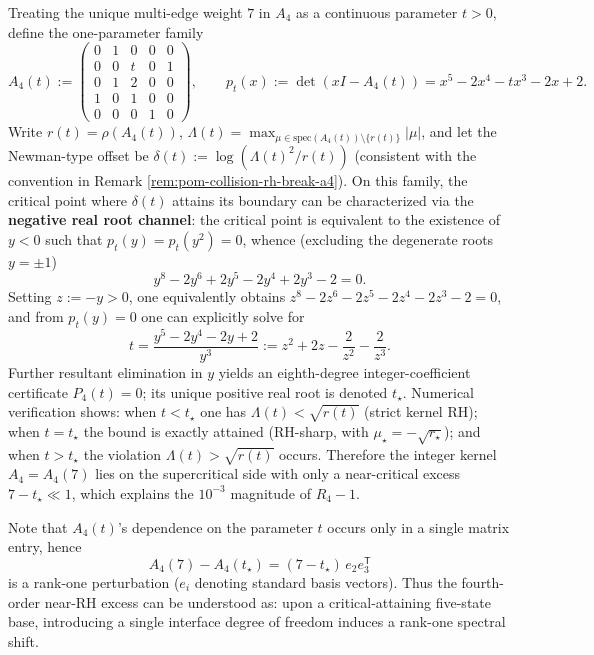 \begin{remark}\label{rem:pom-collision-rh-break-a4-threshold}
Treating the unique multi-edge weight \(7\) in \(A_4\) as a continuous parameter \(t>0\), define the one-parameter family
\[
A_4(t):=
\begin{pmatrix}
0&1&0&0&0\\
0&0&t&0&1\\
0&1&2&0&0\\
1&0&1&0&0\\
0&0&0&1&0
\end{pmatrix},
\qquad
p_t(x):=\det(xI-A_4(t))=x^5-2x^4-tx^3-2x+2.
\]
Write \(r(t)=\rho(A_4(t))\), \(\Lambda(t)=\max_{\mu\in\mathrm{spec}(A_4(t))\setminus\{r(t)\}}|\mu|\), and let the Newman-type offset be
\(
\delta(t):=\log(\Lambda(t)^2/r(t))
\)
(consistent with the convention in Remark \ref{rem:pom-collision-rh-break-a4}).
On this family, the critical point where \(\delta(t)\) attains its boundary can be characterized via the \textbf{negative real root channel}: the critical point is equivalent to the existence of \(y<0\) such that \(p_t(y)=p_t(y^2)=0\), whence (excluding the degenerate roots \(y=\pm 1\))
\[
y^8-2y^6+2y^5-2y^4+2y^3-2=0.
\]
Setting \(z:=-y>0\), one equivalently obtains
\(
z^8-2z^6-2z^5-2z^4-2z^3-2=0
\), and from \(p_t(y)=0\) one can explicitly solve for
\[
t=\frac{y^5-2y^4-2y+2}{y^3}
:=z^2+2z-\frac{2}{z^2}-\frac{2}{z^3}.
\]
Further resultant elimination in \(y\) yields an eighth-degree integer-coefficient certificate \(P_4(t)=0\); its unique positive real root is denoted \(t_\star\).
Numerical verification shows: when \(t<t_\star\) one has \(\Lambda(t)<\sqrt{r(t)}\) (strict kernel RH); when \(t=t_\star\) the bound is exactly attained (RH-sharp, with \(\mu_\star=-\sqrt{r_\star}\)); and when \(t>t_\star\) the violation \(\Lambda(t)>\sqrt{r(t)}\) occurs.
 Therefore the integer kernel \(A_4=A_4(7)\) lies on the supercritical side with only a near-critical excess \(7-t_\star\ll 1\), which explains the \(10^{-3}\) magnitude of \(R_4-1\).
\par
Note that \(A_4(t)\)'s dependence on the parameter \(t\) occurs only in a single matrix entry, hence
\[
A_4(7)-A_4(t_\star)=(7-t_\star)\,e_2e_3^{\mathsf T}
\]
is a rank-one perturbation (\(e_i\) denoting standard basis vectors).
Thus the fourth-order near-RH excess can be understood as: upon a critical-attaining five-state base, introducing a single interface degree of freedom induces a rank-one spectral shift.
\end{remark}

